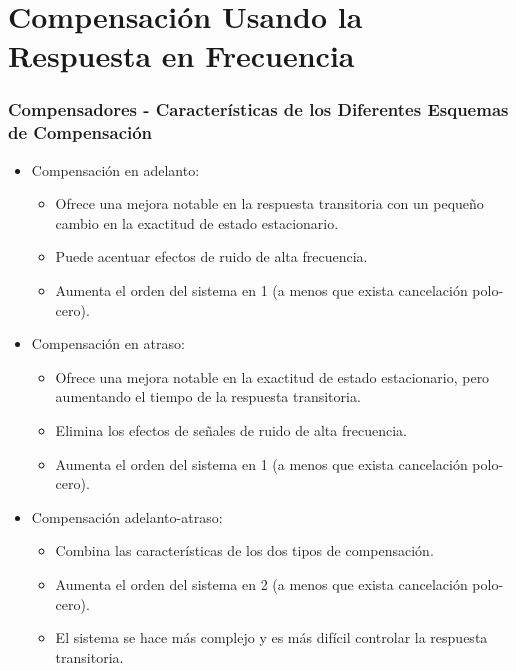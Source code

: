 \documentclass[aspectratio=169]{beamer}
\theoremstyle{definition}
\theoremstyle{plain}
\theoremstyle{remark}
\begin{document}
\section{Compensación Usando la Respuesta en Frecuencia}
\begin{frame}[<+->]\frametitle{Compensadores - Características de los Diferentes Esquemas de Compensación}
 	\begin{itemize}
 		\item Compensación en adelanto:
 		\begin{itemize}
 			\item Ofrece una mejora notable en la respuesta transitoria con un pequeño cambio en la exactitud de estado estacionario.
 			\item Puede acentuar efectos de ruido de alta frecuencia.
 			\item Aumenta el orden del sistema en 1 (a menos que exista cancelación polo-cero).
 		\end{itemize}
 		\item Compensación en atraso:
 		\begin{itemize}
 			\item Ofrece una mejora notable en la exactitud de estado estacionario, pero aumentando el tiempo de la respuesta transitoria.
 			\item Elimina los efectos de señales de ruido de alta frecuencia.
 			\item Aumenta el orden del sistema en 1 (a menos que exista cancelación polo-cero).
 		\end{itemize}
 		\item Compensación adelanto-atraso:
 		\begin{itemize}
 			\item Combina las características de los dos tipos de compensación.
 			\item Aumenta el orden del sistema en 2 (a menos que exista cancelación polo-cero).
 			\item El sistema se hace más complejo y es más difícil controlar la respuesta transitoria.
 		\end{itemize}
  \end{itemize}    
\end{frame}
\end{document}
